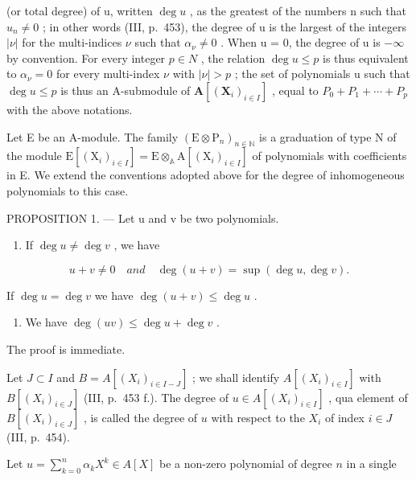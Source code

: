 (or total degree) of u, written \(\deg u\) , as the greatest of the numbers n such that \(u_{n} \neq 0\) ; in other words (III, p.~453), the degree of u is the largest of the integers \(|\nu|\) for the multi-indices \(\nu\) such that \(\alpha_{\nu} \neq 0\) . When u = 0, the degree of u is \(-\infty\) by convention. For every integer \(p \in N\) , the relation \(\deg u \leqslant p\) is thus equivalent to \(\alpha_{\nu} = 0\) for every multi-index \(\nu\) with \(|\nu| > p\) ; the set of polynomials u such that \(\deg u \leqslant p\) is thus an A-submodule of \(\mathbf{A}[(\mathbf{X}_{i})_{i \in I}]\) , equal to \(P_{0} + P_{1} + \cdots + P_{p}\) with the above notations.

Let E be an A-module. The family \((\mathrm{E} \otimes \mathrm{P}_{n})_{n \in \mathbb{N}}\) is a graduation of type N of the module \(\mathrm{E}[(\mathrm{X}_{i})_{i \in I}] = \mathrm{E} \otimes_{\mathbb{A}} \mathrm{A}[(\mathrm{X}_{i})_{i \in I}]\) of polynomials with coefficients in E. We extend the conventions adopted above for the degree of inhomogeneous polynomials to this case.

PROPOSITION 1. --- Let u and v be two polynomials.

\begin{enumerate}
\def\labelenumi{(\roman{enumi})}
\tightlist
\item
  If \(\deg u \neq \deg v\) , we have
\end{enumerate}

\[
u + v \neq 0 \quad a n d \quad \deg (u + v) = \sup (\deg u, \deg v).
\]

If \(\deg u = \deg v\) we have \(\deg (u + v) \leqslant \deg u\) .

\begin{enumerate}
\def\labelenumi{(\roman{enumi})}
\setcounter{enumi}{1}
\tightlist
\item
  We have \(\deg(uv) \leqslant \deg u + \deg v\) .
\end{enumerate}

The proof is immediate.

Let \(J \subset I\) and \(B = A[(X_i)_{i \in I - J}]\) ; we shall identify \(A[(X_i)_{i \in I}]\) with \(B[(X_i)_{i \in J}]\) (III, p.~453 f.). The degree of \(u \in A[(X_i)_{i \in I}]\) , qua element of \(B[(X_i)_{i \in J}]\) , is called the degree of \(u\) with respect to the \(X_i\) of index \(i \in J\) (III, p.~454).

Let \(u = \sum_{k=0}^{n} \alpha_k X^k \in A[X]\) be a non-zero polynomial of degree \(n\) in a single

